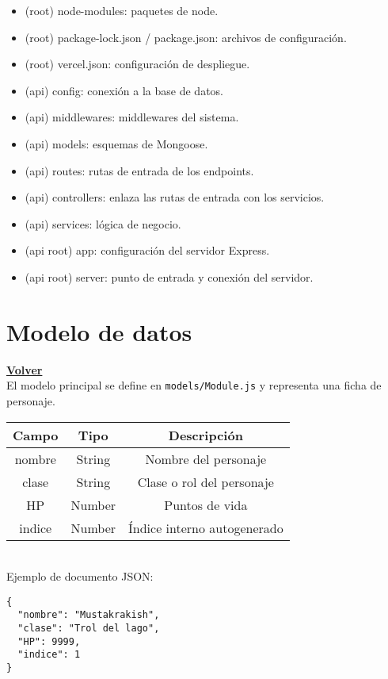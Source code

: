 \documentclass[a4paper,12pt]{article}
\begin{document}
\begin{itemize}
    \item (root) node-modules: paquetes de node.
    \item (root) package-lock.json / package.json: archivos de configuración.
    \item (root) vercel.json: configuración de despliegue.
    \item (api) config: conexión a la base de datos.
    \item (api) middlewares: middlewares del sistema.
    \item (api) models: esquemas de Mongoose.
    \item (api) routes: rutas de entrada de los endpoints.
    \item (api) controllers: enlaza las rutas de entrada con los servicios.
    \item (api) services: lógica de negocio.
    \item (api root) app: configuración del servidor Express.
    \item (api root) server: punto de entrada y conexión del servidor.
\end{itemize}

\clearpage

\section{Modelo de datos}
\hyperlink{anchor-indice}{\textbf{Volver}}\\

El modelo principal se define en \texttt{models/Module.js} y representa una ficha de personaje.\\

\begin{tabular}{|c|c|c|}
    \hline
    \textbf{Campo} & \textbf{Tipo} & \textbf{Descripción} \\
    \hline
    nombre & String & Nombre del personaje \\
    \hline
    clase & String & Clase o rol del personaje \\
    \hline
    HP & Number & Puntos de vida \\
    \hline
    indice & Number & Índice interno autogenerado \\
    \hline
\end{tabular}\\[1em]

Ejemplo de documento JSON:
\begin{verbatim}
{
  "nombre": "Mustakrakish",
  "clase": "Trol del lago",
  "HP": 9999,
  "indice": 1
}
\end{verbatim}
\end{document}
